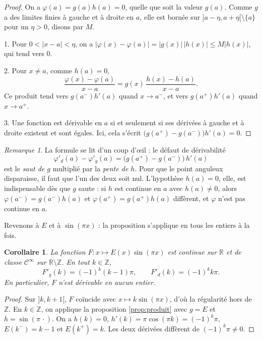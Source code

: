 \documentclass[11pt,a4paper]{article}
\theoremstyle{plain}
\newtheorem{corollaire}[theoreme]{Corollaire}
\theoremstyle{definition}
\theoremstyle{remark}
\newtheorem{remarque}[theoreme]{Remarque}
\newcommand{\Z}{\mathbb{Z}}
\newcommand{\R}{\mathbb{R}}
\newcommand{\Cc}{\mathcal{C}}
\newcommand{\1}{\mathbf{1}}
\begin{document}
\begin{proof}
On a $\varphi(a)=g(a)h(a)=0$, quelle que soit la valeur $g(a)$. Comme $g$ a des limites finies à gauche et à droite en $a$, elle est bornée sur $]a-\eta,a+\eta[\setminus\{a\}$ pour un $\eta>0$, disons par $M$.

1. Pour $0<|x-a|<\eta$, on a $|\varphi(x)-\varphi(a)|=|g(x)|\,|h(x)|\leq M|h(x)|$, qui tend vers $0$.

2. Pour $x\neq a$, comme $h(a)=0$,
\[
  \frac{\varphi(x)-\varphi(a)}{x-a}=g(x)\,\frac{h(x)-h(a)}{x-a}.
\]
Ce produit tend vers $g(a^-)h'(a)$ quand $x\to a^-$, et vers $g(a^+)h'(a)$ quand $x\to a^+$.

3. Une fonction est dérivable en $a$ si et seulement si ses dérivées à gauche et à droite existent et sont égales. Ici, cela s'écrit $\big(g(a^+)-g(a^-)\big)h'(a)=0$.
\end{proof}

\begin{remarque}
La formule se lit d'un coup d'œil : le défaut de dérivabilité
\[
  \varphi'_d(a)-\varphi'_g(a)=\big(g(a^+)-g(a^-)\big)\,h'(a)
\]
est le \emph{saut de $g$} multiplié par la \emph{pente de $h$}. Pour que le point anguleux disparaisse, il faut que l'un des deux soit nul. L'hypothèse $h(a)=0$, elle, est indispensable dès que $g$ saute : si $h$ est continue en $a$ avec $h(a)\neq0$, alors $\varphi(a^-)=g(a^-)h(a)$ et $\varphi(a^+)=g(a^+)h(a)$ diffèrent, et $\varphi$ n'est pas continue en $a$.
\end{remarque}

Revenons à $E$ et à $\sin(\pi x)$ : la proposition s'applique en tous les entiers à la fois.

\begin{corollaire}\label{cor:Esin}
La fonction $F\colon x\mapsto E(x)\sin(\pi x)$ est continue sur $\R$ et de classe $\Cc^\infty$ sur $\R\setminus\Z$. En tout $k\in\Z$,
\[
  F'_g(k)=(-1)^k(k-1)\pi, \qquad F'_d(k)=(-1)^k k\pi .
\]
En particulier, $F$ n'est dérivable en aucun entier.
\end{corollaire}

\begin{proof}
Sur $]k,k+1[$, $F$ coïncide avec $x\mapsto k\sin(\pi x)$, d'où la régularité hors de $\Z$. En $k\in\Z$, on applique la proposition \ref{prop:produit} avec $g=E$ et $h=\sin(\pi\,\cdot)$. On a $h(k)=0$, $h'(k)=\pi\cos(\pi k)=(-1)^k\pi$, $E(k^-)=k-1$ et $E(k^+)=k$. Les deux dérivées diffèrent de $(-1)^k\pi\neq0$.
\end{proof}
\end{document}
